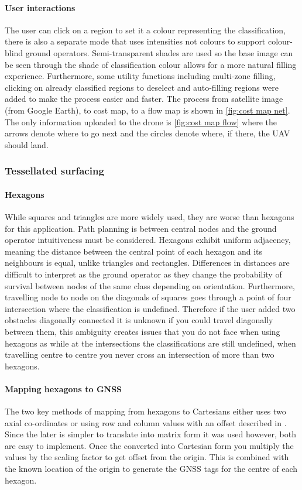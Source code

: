 \paragraph{User interactions}
The user can click on a region to set it a colour representing the classification, there is also a separate mode that uses intensities not colours to support colour-blind ground operators. Semi-transparent shades are used so the base image can be seen through the shade of classification colour allows for a more natural filling experience. Furthermore, some utility functions including multi-zone filling, clicking on already classified regions to deselect and auto-filling regions were added to make the process easier and faster. The process from satellite image (from Google Earth), to cost map, to a flow map is shown in \ref{fig:cost map net}. The only information uploaded to the drone is \ref{fig:cost map flow} where the arrows denote where to go next and the circles denote where, if there, the \gls{UAV} should land.

\subsubsection{Tessellated surfacing}
\paragraph{Hexagons} While squares and triangles are more widely used, they are worse than hexagons for this application. Path planning is between central nodes and the ground operator intuitiveness must be considered. Hexagons exhibit uniform adjacency, meaning the distance between the central point of each hexagon and its neighbours is equal, unlike triangles and rectangles. Differences in distances are difficult to interpret as the ground operator as they change the probability of survival between nodes of the same class depending on orientation. Furthermore, travelling node to node on the diagonals of squares goes through a point of four intersection where the classification is undefined. Therefore if the user added two obstacles diagonally connected it is unknown if you could travel diagonally between them, this ambiguity creates issues that you do not face when using hexagons as while at the intersections the classifications are still undefined, when travelling centre to centre you never cross an intersection of more than two hexagons.
\paragraph{Mapping hexagons to \gls{GNSS}} \label{para:Mapping hexagons}
The two key methods of mapping from hexagons to Cartesians either uses two axial co-ordinates or using row and column values with an offset described in \cite{MappingHexagons}. Since the later is simpler to translate into matrix form it was used however, both are easy to implement. Once the converted into Cartesian form you multiply the values by the scaling factor to get offset from the origin. This is combined with the known location of the origin to generate the \gls{GNSS} tags for the centre of each hexagon.

